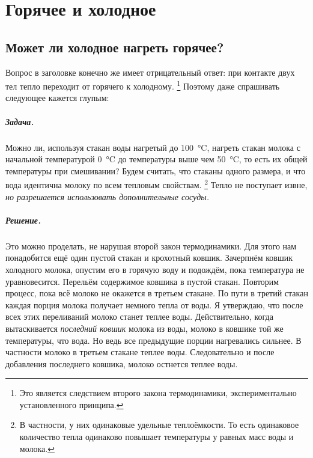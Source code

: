 \chapter{Горячее и холодное}

\section{Может ли холодное нагреть горячее?}

Вопрос в заголовке конечно же имеет отрицательный ответ: при контакте двух тел тепло переходит от горячего к холодному.%
\footnote{Это является следствием второго закона термодинамики, экспериментально установленного принципа.}
Поэтому даже спрашивать следующее кажется глупым:

\paragraph{Задача.}
Можно ли, используя стакан воды нагретый до 100~°C, нагреть стакан молока с начальной температурой 0~°C до температуры выше чем 50~°C, то есть их общей температуры при смешивании?
Будем считать, что стаканы одного размера, и что вода идентична молоку по всем тепловым свойствам.%
\footnote{В частности, у них одинаковые удельные теплоёмкости. То есть одинаковое количество тепла одинаково повышает температуры у равных масс воды и молока.}
Тепло не поступает извне, \emph{но разрешается использовать дополнительные сосуды.}

\paragraph{Решение.}
Это можно проделать, не нарушая второй закон термодинамики.
Для этого нам понадобится ещё один пустой стакан и крохотный ковшик.
Зачерпнём ковшик холодного молока, опустим его в горячую воду и подождём, пока температура не уравновесится.
Перельём содержимое ковшика в пустой стакан.
Повторим процесс, пока всё молоко не окажется в третьем стакане.
По пути в третий стакан каждая порция молока получает немного тепла от воды.
Я утверждаю, что после всех этих переливаний молоко станет теплее воды.
Действительно, когда вытаскивается \emph{последний ковшик} молока из воды, молоко в ковшике той же температуры, что вода.
Но ведь все предыдущие порции нагревались сильнее.
В частности молоко в третьем стакане теплее воды.
Следовательно и после добавления последнего ковшика, молоко остнется теплее воды.

